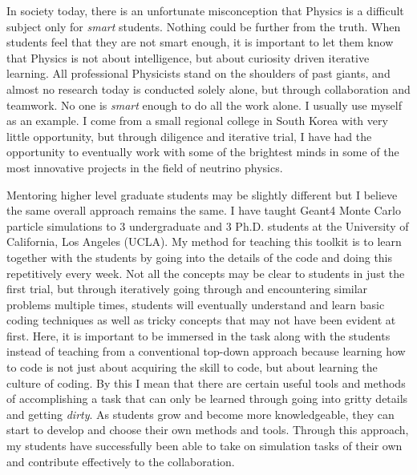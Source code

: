 \documentclass[10pt]{article} %
\begin{document}
In society today, there is an unfortunate misconception that Physics is a
difficult subject only for \textit{smart} students. Nothing could be further
from the truth. When students feel that they are not smart enough, it is
important to let them know that Physics is not about intelligence, but about
curiosity driven iterative learning. All professional Physicists stand on the
shoulders of past giants, and almost no research today is conducted solely
alone, but through collaboration and teamwork. No one is \textit{smart} enough
to do all the work alone. I usually use myself as an example. I come from a
small regional college in South Korea with very little opportunity, but through
diligence and iterative trial, I have had the opportunity to eventually work
with some of the brightest minds in some of the most innovative projects in the
field of neutrino physics.

Mentoring higher level graduate students may be slightly different but I
believe the same overall approach remains the same. I have taught Geant4 Monte
Carlo particle simulations to 3 undergraduate and 3 Ph.D. students at the
University of California, Los Angeles (UCLA). My method for teaching this
toolkit is to learn together with the students by going into the details of the
code and doing this repetitively every week. Not all the concepts may be clear
to students in just the first trial, but through iteratively going through and
encountering similar problems multiple times, students will eventually
understand and learn basic coding techniques as well as tricky concepts that
may not have been evident at first. Here, it is important to be immersed in the
task along with the students instead of teaching from a conventional top-down
approach because learning how to code is not just about acquiring the skill to
code, but about learning the culture of coding. By this I mean that there are
certain useful tools and methods of accomplishing a task that can only be
learned through going into gritty details and getting \textit{dirty}. As
students grow and become more knowledgeable, they can start to develop and
choose their own methods and tools. Through this approach, my students have
successfully been able to take on simulation tasks of their own and contribute
effectively to the collaboration.

\end{document}
